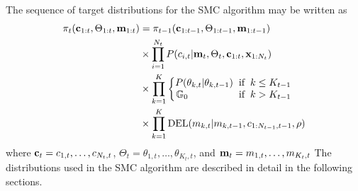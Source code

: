 \documentclass[twocolumn, final]{svjour3}
\begin{document}
The sequence of target distributions for the SMC algorithm may be written as
\begin{equation}
\begin{split}
\pi_{t}(\bold{c}_{1:t}, \Theta_{1:t}, \bold{m}_{1:t}) & =  \pi_{t-1}(\bold{c}_{1:t-1}, \Theta_{1:t-1}, \bold{m}_{1:t-1})\\
& \times \prod_{i=1}^{N_{t}} P(c_{i,t} | \bold{m}_{t}, \Theta_{t}, \bold{c}_{1:t}, \bold{x}_{1:N_{t}}) \\
& \times \prod_{k=1}^{K} 
\begin{cases}
\begin{split}
P(\theta_{k,t} | \theta_{k,t-1}) \hspace{2mm} & \text{if} \hspace{2mm} k \leq K_{t-1} \\
\mathbb{G}_{0} \hspace{18mm} & \text{if} \hspace{2mm} k > K_{t-1}
\end{split}
\end{cases} \\
& \times \prod_{k=1}^{K} \text{DEL}(m_{k,t} | m_{k,t-1}, c_{1:N_{t-1}, t-1}, \rho)
\end{split}
\end{equation}
where $\bold{c}_{t} = c_{1,t}, \ldots, c_{N_{t}, t}$, $\Theta_{t} = \theta_{1,t}, \ldots, \theta_{K_{t}, t}$, and $\bold{m}_{t} = m_{1,t}, \ldots, m_{K_{t}, t}$ The distributions used in the SMC algorithm are described in detail in the following sections.
\end{document}
